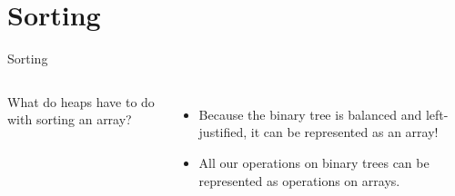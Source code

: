 \documentclass[14pt,aspectratio=1610]{beamer}
\begin{document}
\section{Sorting}

\begin{frame}{Sorting}
\begin{columns}[T]
  What do heaps have to do with sorting an array?
  \begin{itemize}
  \item<2->
    Because the binary tree is balanced and left-justified, it can be represented as an array!
  \item<3->
    All our operations on binary trees can be represented as operations on arrays.
  \end{itemize}
\end{columns}
\end{frame}
\end{document}
